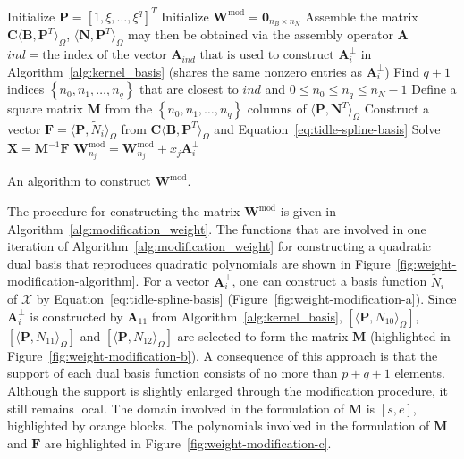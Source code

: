 \begin{algorithm}

	\BlankLine
	Initialize $\mathbf{P}=\left[{1, \xi,\dots,\xi^q}\right]^T$\;
	Initialize $\mathbf{W}^\text{mod}=\mathbf{0}_{n_B \times n_N }$\;
	Assemble the matrix $\mathbf{C}\langle{\mathbf{B},\mathbf{P}^T}\rangle_\Omega$, $\langle{\mathbf{N},\mathbf{P}^T}\rangle_\Omega$ may then be obtained via the assembly operator $\mathbf{A}$\;
	{
	$ind =\text{the index of the vector $\mathbf{A}_{ind}$ that is used to construct $\mathbf{A}^\perp_i$}$ in Algorithm~\ref{alg:kernel_basis} (shares the same nonzero entries as $\mathbf{A}^\perp_i$)\;
	Find $q+1$ indices $\left\{{n_0,n_1,\dots,n_{q}}\right\}$ that are closest to $ind$ and $0\leq{}n_0\leq{}n_q\leq{}n_N-1$\;
	Define a square matrix $\mathbf{M}$ from the $\left\{{n_0,n_1,\dots,n_{q}}\right\}$ columns of $\langle{\mathbf{P},\mathbf{N}^T}\rangle_\Omega$\;
	Construct a vector $\mathbf{F}=\langle \mathbf{P}, \tilde{N}_i \rangle_\Omega$ from $\mathbf{C}\langle{\mathbf{B},\mathbf{P}^T}\rangle_\Omega$ and Equation~\eqref{eq:tidle-spline-basis}\;
	Solve $\mathbf{X}=\mathbf{M}^{-1}\mathbf{F}$\;
	{
		$\mathbf{W}^\text{mod}_{n_j}=\mathbf{W}^\text{mod}_{n_j}+x_j\mathbf{A}^\perp_i$\;
	}
	}
	\caption{An algorithm to construct $\mathbf{W}^\text{mod}$.}\label{alg:modification_weight}
\end{algorithm}

The procedure for constructing the matrix $\mathbf{W}^\text{mod}$ is given in Algorithm~\ref{alg:modification_weight}. The functions that are involved in one iteration of Algorithm~\ref{alg:modification_weight} for constructing a quadratic dual basis that reproduces quadratic polynomials are shown in Figure~\ref{fig:weight-modification-algorithm}. For a vector $\mathbf{A}^\perp_i$, one can construct a basis function $\tilde{N}_i$ of $\mathcal{X}$ by Equation~\eqref{eq:tidle-spline-basis} (Figure~\ref{fig:weight-modification-a}). Since $\mathbf{A}^\perp_i$ is constructed by $\mathbf{A}_{11}$ from Algorithm~\ref{alg:kernel_basis}, $\left[\langle\mathbf{P}, N_{10}\rangle_\Omega\right]$, $\left[\langle\mathbf{P}, N_{11}\rangle_\Omega\right]$ and $\left[\langle\mathbf{P}, N_{12}\rangle_\Omega\right]$ are selected to form the matrix $\mathbf{M}$ (highlighted in Figure~\ref{fig:weight-modification-b}). A consequence of this approach is that the support of each dual basis function consists of no more than $p+q+1$ elements. Although the support is slightly enlarged through the modification procedure, it still remains local. The domain involved in the formulation of $\mathbf{M}$ is $\left[ s, e \right]$, highlighted by orange blocks. The polynomials involved in the formulation of $\mathbf{M}$ and $\mathbf{F}$ are highlighted in Figure~\ref{fig:weight-modification-c}.

